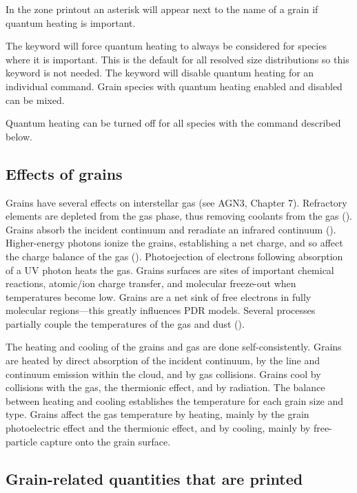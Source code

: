 \begin{description}
In the zone printout an asterisk will appear next to the name
of a grain if quantum heating is important.

The keyword  will force quantum heating to always be considered for species where it is important.
This is the default for all resolved
size distributions so this keyword is not needed.
The keyword  will
disable quantum heating for an individual  command.  Grain species
with quantum heating enabled and disabled can be mixed.

Quantum heating can be turned off for all species with the
command described below.

\end{description}

\subsection{Effects of grains}

Grains have several effects on interstellar gas (see AGN3, Chapter 7).
Refractory elements are depleted from the gas phase,
thus removing coolants
from the gas (\citealp{KingdonFerlandFeibelman1995}).
Grains absorb the
incident continuum and reradiate an infrared continuum
(\citealp{Bottorff1998}).
Higher-energy photons ionize the grains, establishing a net charge,
and so affect the charge balance of the gas (\citealp{Baldwin1991}).
Photoejection of electrons following absorption of a UV photon
heats the gas.
Grains surfaces are sites of important chemical reactions, atomic/ion
charge transfer, and molecular freeze-out when temperatures become low.
Grains are a net sink of free electrons in fully molecular regions---this
greatly influences PDR models.
Several processes partially couple the
temperatures of the gas and dust (\citealp{VanHoof2004}).

The heating and cooling of the grains and gas are done self-consistently.
Grains are heated by direct absorption of the incident continuum, by the
line and continuum emission within the cloud,
and by gas collisions.
Grains cool by collisions with the gas, the thermionic effect,
and by radiation.
The balance between heating and cooling establishes the temperature for
each grain size and type.  Grains affect the gas temperature by heating,
mainly by the grain photoelectric effect and the thermionic effect, and
by cooling, mainly by free-particle capture onto the grain surface.

\subsection{Grain-related quantities that are printed}

